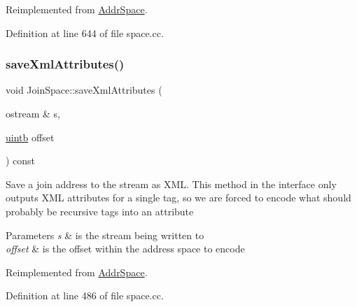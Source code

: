 Reimplemented from \mbox{\hyperlink{class_addr_space_ac073a4d446677c54d769abba01318864}{Addr\+Space}}.



Definition at line 644 of file space.\+cc.

\mbox{\label{class_join_space_a1468359068efe2f1d3fe0c30a4d5ff00}} 
\subsubsection{\texorpdfstring{saveXmlAttributes()}{saveXmlAttributes()}\hspace{0.1cm}{\footnotesize\ttfamily [1/2]}}
{\footnotesize\ttfamily void Join\+Space\+::save\+Xml\+Attributes (\begin{DoxyParamCaption}\item[{ostream \&}]{s,  }\item[{\mbox{\hyperlink{types_8h_a2db313c5d32a12b01d26ac9b3bca178f}{uintb}}}]{offset }\end{DoxyParamCaption}) const\hspace{0.3cm}{\ttfamily [virtual]}}

Save a join address to the stream as X\+ML. This method in the interface only outputs X\+ML attributes for a single tag, so we are forced to encode what should probably be recursive tags into an attribute 
\begin{DoxyParams}{Parameters}
{\em s} & is the stream being written to \\
\hline
{\em offset} & is the offset within the address space to encode \\
\hline
\end{DoxyParams}


Reimplemented from \mbox{\hyperlink{class_addr_space_a4475d64c56141adf80cb0aca5b23e3c6}{Addr\+Space}}.



Definition at line 486 of file space.\+cc.

